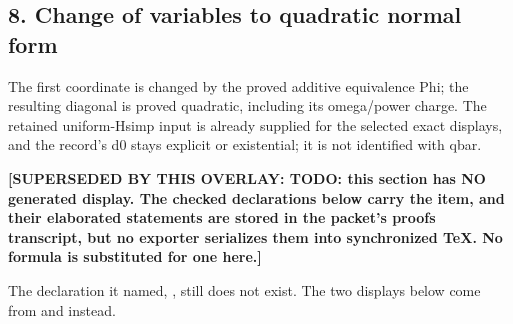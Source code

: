 \subsection*{8. Change of variables to quadratic normal form}
The first coordinate is changed by the proved additive equivalence Phi; the resulting diagonal is proved quadratic, including its omega/power charge. The retained uniform-Hsimp input is already supplied for the selected exact displays, and the record's d0 stays explicit or existential; it is not identified with qbar.

\par\noindent\textbf{[SUPERSEDED BY THIS OVERLAY: TODO: this section has NO generated display. The checked declarations below carry the item, and their elaborated statements are stored in the packet's proofs transcript, but no exporter serializes them into synchronized TeX. No formula is substituted for one here.]}
\par\noindent The declaration it named, , still does not exist. The two displays below come from  and  instead.
